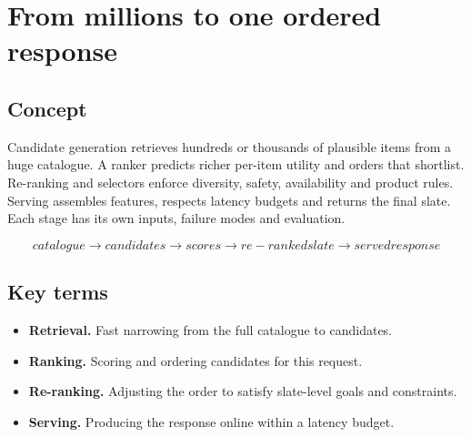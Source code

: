 \section{From millions to one ordered response}

\begin{abstract}
Production systems narrow the problem in stages because no single model can do everything.
\end{abstract}

\subsection{Concept}
Candidate generation retrieves hundreds or thousands of plausible items from a huge catalogue. A ranker predicts richer per-item utility and orders that shortlist. Re-ranking and selectors enforce diversity, safety, availability and product rules. Serving assembles features, respects latency budgets and returns the final slate. Each stage has its own inputs, failure modes and evaluation.

\begin{equation*}
catalogue \rightarrow candidates \rightarrow scores \rightarrow re-ranked slate \rightarrow served response
\end{equation*}

\subsection{Key terms}
\begin{itemize}
\item \textbf{Retrieval.} Fast narrowing from the full catalogue to candidates.
\item \textbf{Ranking.} Scoring and ordering candidates for this request.
\item \textbf{Re-ranking.} Adjusting the order to satisfy slate-level goals and constraints.
\item \textbf{Serving.} Producing the response online within a latency budget.
\end{itemize}
